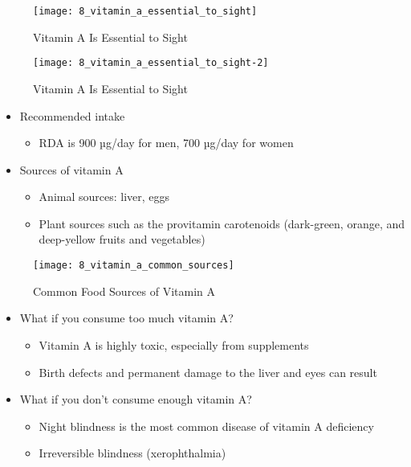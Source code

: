 \documentclass[title={Chapter 8}]{fdsn201notes}
\begin{document}
\begin{figure}[H]
	\centering
	\texttt{[image: 8\_vitamin\_a\_essential\_to\_sight]}
	\caption{Vitamin A Is Essential to Sight}
	\label{fig:vitamin-a-is-essential-to-sight}
\end{figure}

\begin{figure}[H]
	\centering
	\texttt{[image: 8\_vitamin\_a\_essential\_to\_sight-2]}
	\caption{Vitamin A Is Essential to Sight}
	\label{fig:vitamin-a-is-essential-to-sight-cont}
\end{figure}

\begin{itemize}
	\item Recommended intake
	\begin{itemize}
		\item RDA is 900 µg/day for men, 700 µg/day for women
	\end{itemize}
	\item Sources of vitamin A
	\begin{itemize}
		\item Animal sources: liver, eggs
		\item Plant sources such as the provitamin carotenoids (dark-green, orange, and deep-yellow fruits and vegetables)
	\end{itemize}
\end{itemize}

\begin{figure}[H]
	\centering
	\texttt{[image: 8\_vitamin\_a\_common\_sources]}
	\caption{Common Food Sources of Vitamin A}
	\label{fig:common-food-sources-of-vitamin-a}
\end{figure}

\begin{itemize}
	\item What if you consume too much vitamin A?
	\begin{itemize}
		\item Vitamin A is highly toxic, especially from supplements
		\item Birth defects and permanent damage to the liver and eyes can result
	\end{itemize}
	\item What if you don’t consume enough vitamin A?
	\begin{itemize}
		\item Night blindness is the most common disease of vitamin A deficiency
		\item Irreversible blindness (xerophthalmia)
	\end{itemize}
\end{itemize}
\end{document}
